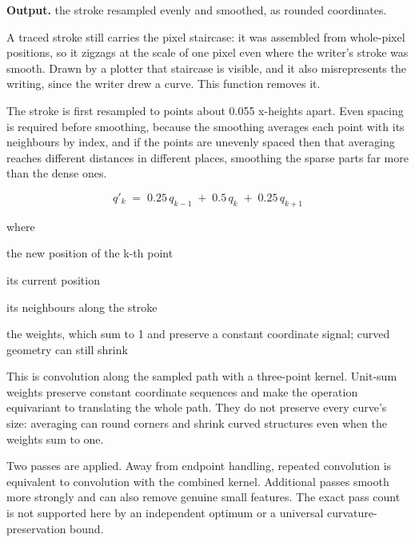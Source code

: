 \noindent\textbf{Output.} the stroke resampled evenly and smoothed, as rounded coordinates.


A traced stroke still carries the pixel staircase: it was assembled from whole-pixel positions, so it zigzags at the scale of one pixel even where the writer's stroke was smooth. Drawn by a plotter that staircase is visible, and it also misrepresents the writing, since the writer drew a curve. This function removes it.


The stroke is first resampled to points about 0.055 x-heights apart. Even spacing is required before smoothing, because the smoothing averages each point with its neighbours by index, and if the points are unevenly spaced then that averaging reaches different distances in different places, smoothing the sparse parts far more than the dense ones.



\begin{equation}
q'_k \;=\; 0.25\,q_{k-1} \;+\; 0.5\,q_k \;+\; 0.25\,q_{k+1}
\end{equation}

\noindent where
\begin{description}[leftmargin=2.4em,style=nextline,font=\normalfont\ttfamily]\setlength\itemsep{1pt}
  \item[{$q'_k$}] \normalfont the new position of the k-th point
  \item[{$q_k$}] \normalfont its current position
  \item[{$q_{k-1},\, q_{k+1}$}] \normalfont its neighbours along the stroke
  \item[{$0.25,\,0.5,\,0.25$}] \normalfont the weights, which sum to 1 and preserve a constant coordinate signal; curved geometry can still shrink
\end{description}
This is convolution along the sampled path with a three-point kernel. Unit-sum weights preserve constant coordinate sequences and make the operation equivariant to translating the whole path. They do not preserve every curve's size: averaging can round corners and shrink curved structures even when the weights sum to one.

Two passes are applied. Away from endpoint handling, repeated convolution is equivalent to convolution with the combined kernel. Additional passes smooth more strongly and can also remove genuine small features. The exact pass count is not supported here by an independent optimum or a universal curvature-preservation bound.


